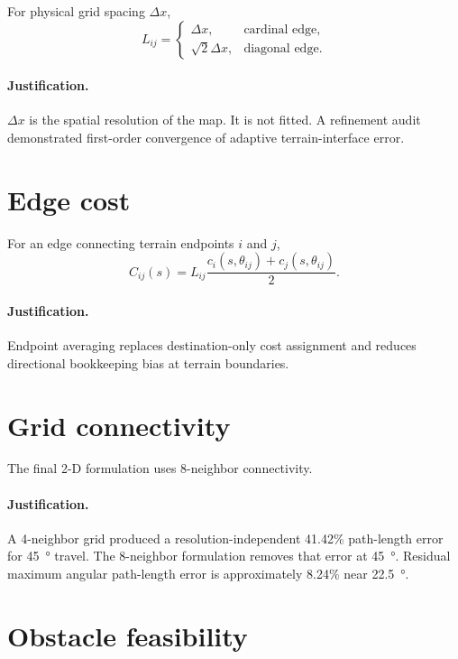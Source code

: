 \documentclass[11pt]{article}
\begin{document}
For physical grid spacing $\Delta x$,
\begin{equation}
L_{ij}=
\begin{cases}
\Delta x, & \text{cardinal edge},\\
\sqrt{2}\Delta x, & \text{diagonal edge}.
\end{cases}
\end{equation}

\paragraph{Justification.}
$\Delta x$ is the spatial resolution of the map. It is not fitted. A refinement audit demonstrated first-order convergence of adaptive terrain-interface error.

\section{Edge cost}

For an edge connecting terrain endpoints $i$ and $j$,
\begin{equation}
C_{ij}(s)
=
L_{ij}
\frac{
c_i(s,\theta_{ij})+
c_j(s,\theta_{ij})
}{2}.
\end{equation}

\paragraph{Justification.}
Endpoint averaging replaces destination-only cost assignment and reduces directional bookkeeping bias at terrain boundaries.

\section{Grid connectivity}

The final 2-D formulation uses 8-neighbor connectivity.

\paragraph{Justification.}
A 4-neighbor grid produced a resolution-independent 41.42\% path-length error for \SI{45}{\degree} travel. The 8-neighbor formulation removes that error at \SI{45}{\degree}. Residual maximum angular path-length error is approximately 8.24\% near \SI{22.5}{\degree}.

\section{Obstacle feasibility}
\end{document}
